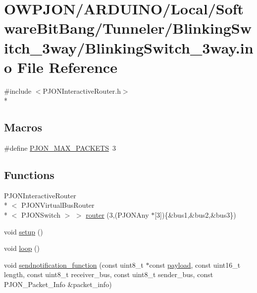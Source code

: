 \hypertarget{BlinkingSwitch__3way_8ino}{\section{O\-W\-P\-J\-O\-N/\-A\-R\-D\-U\-I\-N\-O/\-Local/\-Software\-Bit\-Bang/\-Tunneler/\-Blinking\-Switch\-\_\-3way/\-Blinking\-Switch\-\_\-3way.ino File Reference}
\label{BlinkingSwitch__3way_8ino}
}
{\ttfamily \#include $<$P\-J\-O\-N\-Interactive\-Router.\-h$>$}\\*
\subsection*{Macros}
\begin{DoxyCompactItemize}
\item 
\#define \hyperlink{BlinkingSwitch__3way_8ino_af093da5eac99580be6ba61b4dc79f2c1}{P\-J\-O\-N\-\_\-\-M\-A\-X\-\_\-\-P\-A\-C\-K\-E\-T\-S}~3
\end{DoxyCompactItemize}
\subsection*{Functions}
\begin{DoxyCompactItemize}
\item 
P\-J\-O\-N\-Interactive\-Router\\*
$<$ P\-J\-O\-N\-Virtual\-Bus\-Router\\*
$<$ P\-J\-O\-N\-Switch $>$ $>$ \hyperlink{BlinkingSwitch__3way_8ino_a3478ba3105bbd4268019417f91edaa72}{router} (3,(P\-J\-O\-N\-Any $\ast$\mbox{[}3\mbox{]})\{\&bus1,\&bus2,\&bus3\})
\item 
void \hyperlink{BlinkingSwitch__3way_8ino_a4fc01d736fe50cf5b977f755b675f11d}{setup} ()
\item 
void \hyperlink{BlinkingSwitch__3way_8ino_afe461d27b9c48d5921c00d521181f12f}{loop} ()
\item 
void \hyperlink{BlinkingSwitch__3way_8ino_af488e931618139cd40b126dabfe9b6bb}{sendnotification\-\_\-function} (const uint8\-\_\-t $\ast$const \hyperlink{Uno__Dragino__LoRa__GPS__Shield__TTN_8ino_a78a402d1762842473567de90b11ed256}{payload}, const uint16\-\_\-t length, const uint8\-\_\-t receiver\-\_\-bus, const uint8\-\_\-t sender\-\_\-bus, const P\-J\-O\-N\-\_\-\-Packet\-\_\-\-Info \&packet\-\_\-info)
\end{DoxyCompactItemize}
